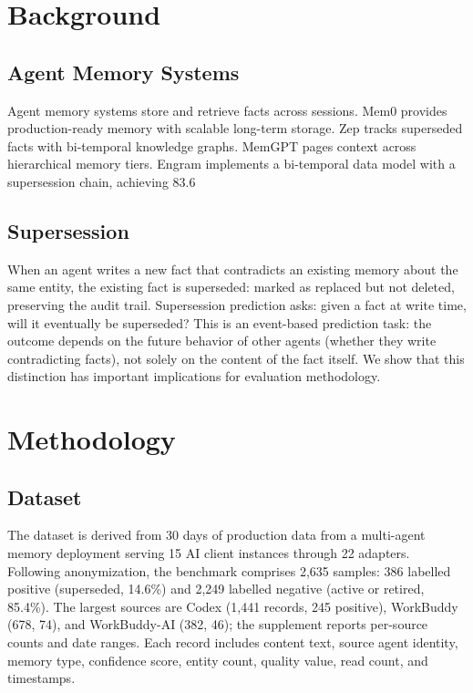 \documentclass[sigconf,nonacm]{acmart}
\begin{document}
\section{Background}
\label{sec:background}

\subsection{Agent Memory Systems}
Agent memory systems store and retrieve facts across sessions. Mem0 provides production-ready memory with scalable long-term storage. Zep tracks superseded facts with bi-temporal knowledge graphs. MemGPT pages context across hierarchical memory tiers. Engram implements a bi-temporal data model with a supersession chain, achieving 83.6%

\subsection{Supersession}
When an agent writes a new fact that contradicts an existing memory about the same entity, the existing fact is superseded: marked as replaced but not deleted, preserving the audit trail. Supersession prediction asks: given a fact at write time, will it eventually be superseded? This is an event-based prediction task: the outcome depends on the future behavior of other agents (whether they write contradicting facts), not solely on the content of the fact itself. We show that this distinction has important implications for evaluation methodology.

\section{Methodology}
\label{sec:methodology}

\subsection{Dataset}
The dataset is derived from 30 days of production data from a multi-agent memory deployment serving 15 AI client instances through 22 adapters. Following anonymization, the benchmark comprises 2,635 samples: 386 labelled positive (superseded, 14.6\%) and 2,249 labelled negative (active or retired, 85.4\%). The largest sources are Codex (1,441 records, 245 positive), WorkBuddy (678, 74), and WorkBuddy-AI (382, 46); the supplement reports per-source counts and date ranges. Each record includes content text, source agent identity, memory type, confidence score, entity count, quality value, read count, and timestamps.
\end{document}
